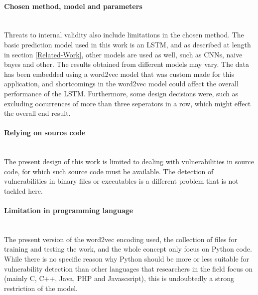 \documentclass[
	a4paper,
	pagesize,
	pdftex,
	12pt,
	twoside, %
	BCOR=5mm, %
	ngerman,
	fleqn,
	final,
	]{scrartcl}
\begin{document}
\paragraph{Chosen method, model and parameters}\mbox{}\\
Threats to internal validity also include limitations in the chosen method. The basic prediction model used in this work is an LSTM, and as described at length in section \ref{Related-Work}, other models are used as well, such as CNNs, naive bayes and other. The results obtained from different models may vary. The data has been embedded using a word2vec model that was custom made for this application, and shortcomings in the word2vec model could affect the overall performance of the LSTM. Furthermore, some design decisions were, such as excluding occurrences of more than three seperators in a row, which might effect the overall end result.  
\paragraph{Relying on source code}\mbox{}\\
The present design of this work is limited to dealing with vulnerabilities in source code, for which such source code must be available. The detection of vulnerabilities in binary files or executables is a different problem that is not tackled here. 
\paragraph{Limitation in programming language}\mbox{}\\
The present version of the word2vec encoding used, the collection of files for training and testing the work, and the whole concept only focus on Python code. While there is no specific reason why Python should be more or less suitable for vulnerability detection than other languages that researchers in the field focus on (mainly C, C++, Java, PHP and Javascsript), this is undoubtedly a strong restriction of the model.
\end{document}
